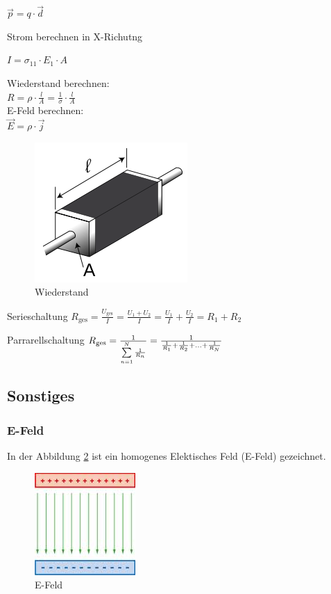\documentclass[a4paper]{scrartcl}
\begin{document}
$ \vec{p}=q\cdot\vec{d} $


Strom berechnen in X-Richutng

$ I = \sigma_{11} \cdot E_1 \cdot A $


Wiederstand berechnen:\\
$ R=\rho\cdot\frac{l}{A}=\frac{1}{\sigma} \cdot\frac{l}{A}$\\

E-Feld berechnen:\\
$ \vec E = \rho \cdot \vec j $\\


\begin{figure}[h!]
\begin{center}
\includegraphics[scale=0.5]{images/Wiederstand.png}
\caption{Wiederstand}
\label{fig:Wiederstand}
\end{center}
\end{figure}

Serieschaltung
$R_\mathrm{ges} = \frac{U_\mathrm{ges}}{I} = \frac{U_1 + U_2}{I} = \frac{U_1}{I} + \frac{U_2}{I} = R_1 + R_2 $


Parrarellschaltung
$
R_\mathrm{ges} = {1 \over {\sum\limits_{n=1}^N {1 \over R_n}}} = {1 \over {{1 \over R_1} + {1 \over R_2} + \ldots + {1 \over R_N}}}$





\subsection{Sonstiges}



\subsubsection{E-Feld}

In der Abbildung \ref{fig:E-Feld} ist ein homogenes Elektisches Feld (E-Feld) gezeichnet.

\begin{figure}[h!]
\begin{center}
\includegraphics[scale=0.5]{images/E-Feld.jpg}
\caption{E-Feld}
\label{fig:E-Feld}
\end{center}
\end{figure}
\end{document}
